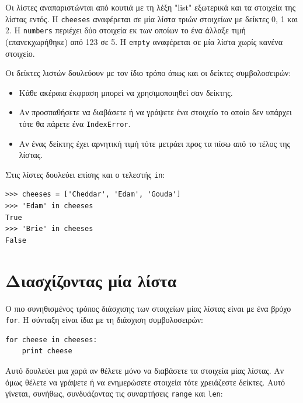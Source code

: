 \documentclass[10pt]{book}
\begin{document}
Οι λίστες αναπαριστώνται από κουτιά με τη λέξη "list" εξωτερικά και
τα στοιχεία της λίστας εντός. Η {\tt cheeses} αναφέρεται σε μία λίστα
τριών στοιχείων με δείκτες 0, 1 και 2. Η {\tt numbers} περιέχει δύο
στοιχεία εκ των οποίων το ένα άλλαξε τιμή (επανεκχωρήθηκε) από 123 σε 5. Η
{\tt empty} αναφέρεται σε μία λίστα χωρίς κανένα στοιχείο.

Οι δείκτες λιστών δουλεύουν με τον ίδιο τρόπο όπως και οι δείκτες συμβολοσειρών:

\begin{itemize}

\item  Κάθε ακέραια έκφραση μπορεί να χρησιμοποιηθεί σαν δείκτης.

\item  Αν προσπαθήσετε να διαβάσετε ή να γράψετε ένα στοιχείο το οποίο δεν υπάρχει τότε θα πάρετε ένα {\tt IndexError}.

\item  Αν ένας δείκτης έχει αρνητική τιμή τότε μετράει προς τα πίσω από το τέλος της λίστας.

\end{itemize}



Στις λίστες δουλεύει επίσης και ο τελεστής {\tt in}:

\begin{verbatim}
>>> cheeses = ['Cheddar', 'Edam', 'Gouda']
>>> 'Edam' in cheeses
True
>>> 'Brie' in cheeses
False
\end{verbatim}



\section{Διασχίζοντας μία λίστα}

Ο πιο συνηθισμένος τρόπος διάσχισης των στοιχείων μίας λίστας είναι
με ένα βρόχο {\tt for}. Η σύνταξη είναι ίδια με τη διάσχιση συμβολοσειρών:

\begin{verbatim}
for cheese in cheeses:
    print cheese
\end{verbatim}
%

Αυτό δουλεύει μια χαρά αν θέλετε μόνο να διαβάσετε τα στοιχεία μίας λίστας. Αν όμως θέλετε να γράψετε ή να ενημερώσετε στοιχεία τότε χρειάζεστε δείκτες. Αυτό
γίνεται, συνήθως, συνδυάζοντας τις συναρτήσεις {\tt range} και {\tt len}:
\end{document}
